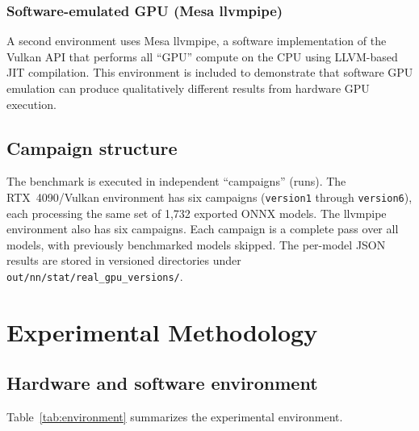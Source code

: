 \documentclass[10pt,twocolumn,letterpaper]{article}
\begin{document}
\subsubsection{Software-emulated GPU (Mesa llvmpipe)}

A second environment uses Mesa llvmpipe, a software implementation of the Vulkan API that performs all ``GPU'' compute on the CPU using LLVM-based JIT compilation. This environment is included to demonstrate that software GPU emulation can produce qualitatively different results from hardware GPU execution.

\subsection{Campaign structure}

The benchmark is executed in independent ``campaigns'' (runs). The RTX~4090/Vulkan environment has six campaigns (\texttt{version1} through \texttt{version6}), each processing the same set of 1,732 exported ONNX models. The llvmpipe environment also has six campaigns. Each campaign is a complete pass over all models, with previously benchmarked models skipped. The per-model JSON results are stored in versioned directories under \texttt{out/nn/stat/real\_gpu\_versions/}.

\section{Experimental Methodology}\label{sec:methodology}

\subsection{Hardware and software environment}

Table~\ref{tab:environment} summarizes the experimental environment.
\end{document}
